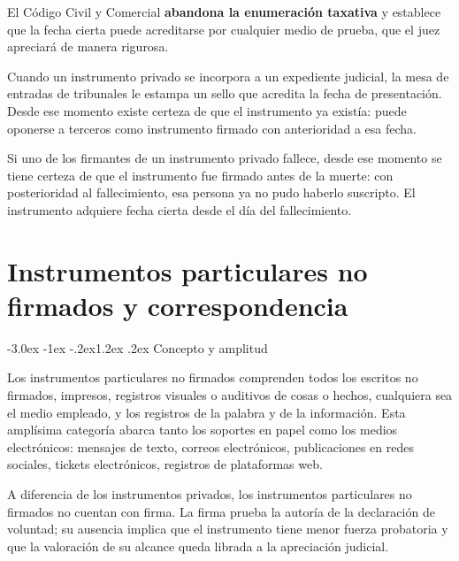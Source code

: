 \documentclass[12pt,oneside]{book}
\makeatletter
\renewcommand\section{\@startsection{section}{1}{\z@}%
  {-3.0ex \@plus -1ex \@minus -.2ex}{1.2ex \@plus .2ex}%
  {\normalfont\large\bfseries\color{acento}}}
\makeatother
\begin{document}
El Código Civil y Comercial \textbf{abandona la enumeración taxativa} y establece que la fecha cierta puede acreditarse por cualquier medio de prueba, que el juez apreciará de manera rigurosa.

\begin{ejemplo}
Cuando un instrumento privado se incorpora a un expediente judicial, la mesa de entradas de tribunales le estampa un sello que acredita la fecha de presentación. Desde ese momento existe certeza de que el instrumento ya existía: puede oponerse a terceros como instrumento firmado con anterioridad a esa fecha.
\end{ejemplo}

\begin{ejemplo}
Si uno de los firmantes de un instrumento privado fallece, desde ese momento se tiene certeza de que el instrumento fue firmado antes de la muerte: con posterioridad al fallecimiento, esa persona ya no pudo haberlo suscripto. El instrumento adquiere fecha cierta desde el día del fallecimiento.
\end{ejemplo}


\chapter{Instrumentos particulares no firmados y correspondencia}

\section{Concepto y amplitud}

Los instrumentos particulares no firmados comprenden todos los escritos no firmados, impresos, registros visuales o auditivos de cosas o hechos, cualquiera sea el medio empleado, y los registros de la palabra y de la información. Esta amplísima categoría abarca tanto los soportes en papel como los medios electrónicos: mensajes de texto, correos electrónicos, publicaciones en redes sociales, tickets electrónicos, registros de plataformas web.

\begin{nota}
A diferencia de los instrumentos privados, los instrumentos particulares no firmados no cuentan con firma. La firma prueba la autoría de la declaración de voluntad; su ausencia implica que el instrumento tiene menor fuerza probatoria y que la valoración de su alcance queda librada a la apreciación judicial.
\end{nota}
\end{document}
